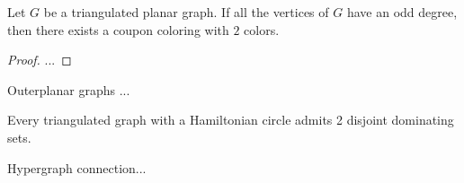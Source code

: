 \begin{thm}
  Let $G$ be a triangulated planar graph. If all the vertices of $G$ have an
  odd degree, then there exists a coupon coloring with $2$ colors.
\end{thm}
\begin{proof}
  ...
\end{proof}

\begin{thm}
  Outerplanar graphs ...
\end{thm}

\begin{thm}
  Every triangulated graph with a Hamiltonian circle admits 2 disjoint
  dominating sets.
\end{thm}

Hypergraph connection...
